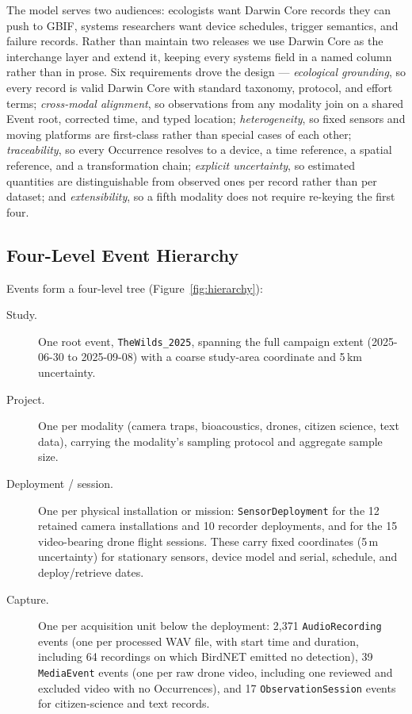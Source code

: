 \documentclass[sigconf]{acmart}
\begin{document}
The model serves two audiences: ecologists want Darwin Core records they
can push to GBIF, systems researchers want device schedules, trigger
semantics, and failure records. Rather than maintain two releases we use
Darwin Core as the interchange layer and extend it, keeping every
systems field in a named column rather than in prose. Six requirements
drove the design --- \emph{ecological grounding}, so every record is
valid Darwin Core with standard taxonomy, protocol, and effort terms;
\emph{cross-modal alignment}, so observations from any modality join
on a shared Event root, corrected time, and typed location;
\emph{heterogeneity}, so fixed sensors and moving
platforms are first-class rather than special cases of each other;
\emph{traceability}, so every Occurrence resolves to a device, a time
reference, a spatial reference, and a transformation chain;
\emph{explicit uncertainty}, so estimated quantities are distinguishable
from observed ones per record rather than per dataset; and
\emph{extensibility}, so a fifth modality does not require re-keying the
first four.

\subsection{Four-Level Event Hierarchy}

Events form a four-level tree (Figure~\ref{fig:hierarchy}):

\begin{description}
\item[Study.] One root event, \texttt{TheWilds\_2025}, spanning the full
campaign extent (2025-06-30 to 2025-09-08) with a coarse study-area
coordinate and 5\,km uncertainty.
\item[Project.] One per modality (camera traps, bioacoustics, drones,
citizen science, text data), carrying the modality's sampling protocol
and aggregate sample size.
\item[Deployment / session.] One per physical installation or mission:
\texttt{SensorDeployment} for the 12 retained camera installations and
10 recorder deployments, and for the 15 video-bearing drone flight sessions. These
carry fixed coordinates (5\,m uncertainty) for stationary sensors,
device model and serial, schedule, and deploy/retrieve dates.
\item[Capture.] One per acquisition unit below the deployment:
2{,}371 \texttt{AudioRecording} events (one per processed WAV file,
with start time and duration, including 64 recordings on which BirdNET
emitted no detection), 39 \texttt{MediaEvent} events (one per raw drone
video, including one reviewed and excluded video with no Occurrences),
and 17 \texttt{ObservationSession} events for citizen-science and text
records.
\end{description}
\end{document}
